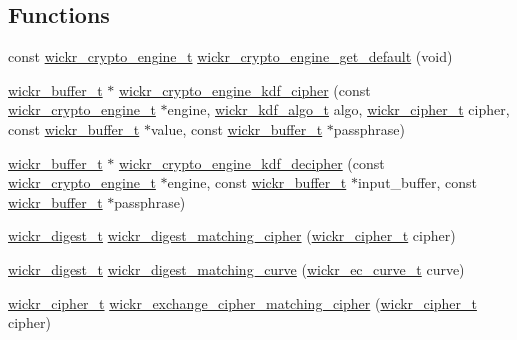 \subsection*{Functions}
\begin{DoxyCompactItemize}
\item 
const \mbox{\hyperlink{structwickr__crypto__engine}{wickr\+\_\+crypto\+\_\+engine\+\_\+t}} \mbox{\hyperlink{group__wickr__crypto__engine_ga4d68232f729ffeda16657582a5267d07}{wickr\+\_\+crypto\+\_\+engine\+\_\+get\+\_\+default}} (void)
\item 
\mbox{\hyperlink{structwickr__buffer}{wickr\+\_\+buffer\+\_\+t}} $\ast$ \mbox{\hyperlink{group__wickr__crypto__engine_ga5709d94cd09ef0fb47d1a5f59232f115}{wickr\+\_\+crypto\+\_\+engine\+\_\+kdf\+\_\+cipher}} (const \mbox{\hyperlink{structwickr__crypto__engine}{wickr\+\_\+crypto\+\_\+engine\+\_\+t}} $\ast$engine, \mbox{\hyperlink{structwickr__kdf__algo}{wickr\+\_\+kdf\+\_\+algo\+\_\+t}} algo, \mbox{\hyperlink{structwickr__cipher}{wickr\+\_\+cipher\+\_\+t}} cipher, const \mbox{\hyperlink{structwickr__buffer}{wickr\+\_\+buffer\+\_\+t}} $\ast$value, const \mbox{\hyperlink{structwickr__buffer}{wickr\+\_\+buffer\+\_\+t}} $\ast$passphrase)
\item 
\mbox{\hyperlink{structwickr__buffer}{wickr\+\_\+buffer\+\_\+t}} $\ast$ \mbox{\hyperlink{group__wickr__crypto__engine_gab60480270e80ba34aa44385633037983}{wickr\+\_\+crypto\+\_\+engine\+\_\+kdf\+\_\+decipher}} (const \mbox{\hyperlink{structwickr__crypto__engine}{wickr\+\_\+crypto\+\_\+engine\+\_\+t}} $\ast$engine, const \mbox{\hyperlink{structwickr__buffer}{wickr\+\_\+buffer\+\_\+t}} $\ast$input\+\_\+buffer, const \mbox{\hyperlink{structwickr__buffer}{wickr\+\_\+buffer\+\_\+t}} $\ast$passphrase)
\item 
\mbox{\hyperlink{structwickr__digest}{wickr\+\_\+digest\+\_\+t}} \mbox{\hyperlink{group__wickr__crypto__engine_ga18c21501a41c97f2ba79a9366343cdcf}{wickr\+\_\+digest\+\_\+matching\+\_\+cipher}} (\mbox{\hyperlink{structwickr__cipher}{wickr\+\_\+cipher\+\_\+t}} cipher)
\item 
\mbox{\hyperlink{structwickr__digest}{wickr\+\_\+digest\+\_\+t}} \mbox{\hyperlink{group__wickr__crypto__engine_ga0a708e5e46c40eae5eaeb581f6a1aed2}{wickr\+\_\+digest\+\_\+matching\+\_\+curve}} (\mbox{\hyperlink{structwickr__ec__curve}{wickr\+\_\+ec\+\_\+curve\+\_\+t}} curve)
\item 
\mbox{\hyperlink{structwickr__cipher}{wickr\+\_\+cipher\+\_\+t}} \mbox{\hyperlink{group__wickr__crypto__engine_gaf44e3be9066727bf83034d3593dc74e2}{wickr\+\_\+exchange\+\_\+cipher\+\_\+matching\+\_\+cipher}} (\mbox{\hyperlink{structwickr__cipher}{wickr\+\_\+cipher\+\_\+t}} cipher)
\end{DoxyCompactItemize}
